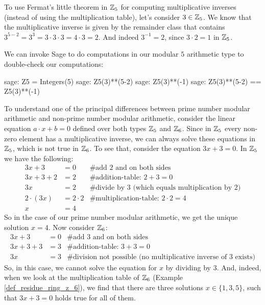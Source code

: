 \begin{example} 
To use Fermat's little theorem in $\mathbb{Z}_5$ for computing multiplicative inverses (instead of using the multiplication table), let's consider $3\in\mathbb{Z}_5$. We know that the multiplicative inverse is given by the remainder class that contains $3^{5-2}=3^3=3\cdot 3\cdot 3= 4\cdot 3 = 2$. And indeed $3^{-1}=2$, since $3\cdot 2 =1$ in $\mathbb{Z}_5$.

We can invoke Sage to do computations in our modular $5$ arithmetic type to double-check our computations:
\begin{sagecommandline}
sage: Z5 = Integers(5)
sage: Z5(3)**(5-2)
sage: Z5(3)**(-1)
sage: Z5(3)**(5-2) == Z5(3)**(-1)
\end{sagecommandline}
\end{example}
\begin{example}
To understand one of the principal differences between prime number modular arithmetic and non-prime number modular arithmetic, consider the linear equation $a\cdot x +b=0$ defined over both types $\mathbb{Z}_5$ and $\mathbb{Z}_6$. Since in $\mathbb{Z}_5$ every non-zero element has a multiplicative inverse, we can always solve these equations in $\mathbb{Z}_5$, which is not true in $\mathbb{Z}_6$. To see that, consider the equation $3x+3=0$. In $\mathbb{Z}_5$ we have the following:
\begin{align*}
3x+3    &= 0 & \text{\# add 2 and on both sides} \\
3x+3+2  &= 2 & \text{\# addition-table: } 2+3 = 0 \\
3x      &= 2 & \text{\# divide by } 3  \text{ (which equals multiplication by 2)}\\
2\cdot(3x)      &= 2\cdot 2 & \text{\# multiplication-table: } 2\cdot 2=4 \\
 x      &= 4 &
\end{align*}
So in the case of our prime number modular arithmetic, we get the unique solution $x=4$. Now consider $\mathbb{Z}_6$:
\begin{align*}
3x+3    &= 0 & \text{\# add 3 and on both sides} \\
3x+3+3  &= 3 & \text{\# addition-table: } 3+3 = 0 \\
3x      &= 3 & \text{\# division not possible (no multiplicative inverse of 3  exists)}
\end{align*}
So, in this case, we cannot solve the equation for $x$ by dividing by $3$. And, indeed, when we look at the multiplication table of $\mathbb{Z}_6$ (Example \ref{def_residue_ring_z_6}), we find that there are three solutions $x\in\{1,3,5\}$, such that $3x+3=0$ holds true for all of them.
\end{example}
